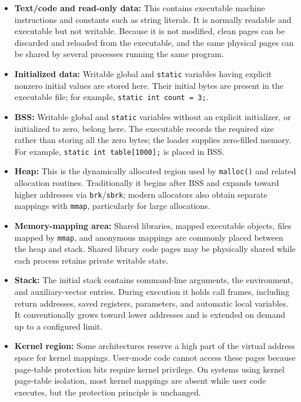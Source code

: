 \begin{itemize}
  \item \textbf{Text/code and read-only data:} This contains executable
  machine instructions and constants such as string literals.  It is
  normally readable and executable but not writable.  Because it is not
  modified, clean pages can be discarded and reloaded from the executable,
  and the same physical pages can be shared by several processes running the
  same program.

  \item \textbf{Initialized data:} Writable global and \texttt{static}
  variables having explicit nonzero initial values are stored here.  Their
  initial bytes are present in the executable file; for example,
  \texttt{static int count = 3;}.

  \item \textbf{BSS:} Writable global and \texttt{static} variables without
  an explicit initializer, or initialized to zero, belong here.  The
  executable records the required size rather than storing all the zero
  bytes; the loader supplies zero-filled memory.  For example,
  \texttt{static int table[1000];} is placed in BSS.

  \item \textbf{Heap:} This is the dynamically allocated region used by
  \texttt{malloc()} and related allocation routines.  Traditionally it
  begins after BSS and expands toward higher addresses via
  \texttt{brk}/\texttt{sbrk}; modern allocators also obtain separate
  mappings with \texttt{mmap}, particularly for large allocations.

  \item \textbf{Memory-mapping area:} Shared libraries, mapped executable
  objects, files mapped by \texttt{mmap}, and anonymous mappings are commonly
  placed between the heap and stack.  Shared library code pages may be
  physically shared while each process retains private writable state.

  \item \textbf{Stack:} The initial stack contains command-line arguments,
  the environment, and auxiliary-vector entries.  During execution it holds
  call frames, including return addresses, saved registers, parameters, and
  automatic local variables.  It conventionally grows toward lower
  addresses and is extended on demand up to a configured limit.

  \item \textbf{Kernel region:} Some architectures reserve a high part of
  the virtual address space for kernel mappings.  User-mode code cannot
  access these pages because page-table protection bits require kernel
  privilege.  On systems using kernel page-table isolation, most kernel
  mappings are absent while user code executes, but the protection principle
  is unchanged.
\end{itemize}

